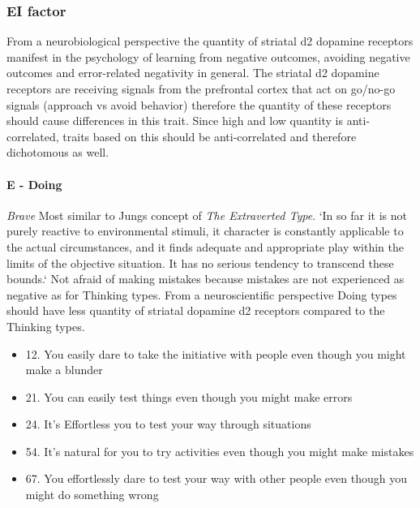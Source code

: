 \documentclass[11pt,a4paper]{article}
\begin{document}
\subsubsection{EI factor}
From a neurobiological perspective the quantity of striatal d2 dopamine receptors manifest in the psychology of learning from negative outcomes, avoiding negative outcomes and error-related negativity in general. The striatal d2 dopamine receptors are receiving signals from the prefrontal cortex that act on go/no-go signals (approach vs avoid behavior) therefore the quantity of these receptors should cause differences in this trait. Since high and low quantity is anti-correlated, traits based on this should be anti-correlated and therefore dichotomous as well.\cite{ie1,ie2,ie3,ie4,ie5,ie6,ie7}

\paragraph{E - Doing}
\emph{Brave}
Most similar to Jungs concept of \emph{The Extraverted Type}.
`In so far it is not purely reactive to environmental stimuli, it character is constantly applicable to the actual circumstances, and it finds adequate and appropriate play within the limits of the objective situation. It has no serious tendency to transcend these bounds.`\cite[p. 418]{jung1}
Not afraid of making mistakes because mistakes are not experienced as negative as for Thinking types.
From a neuroscientific perspective Doing types should have less quantity of striatal dopamine d2 receptors compared to the Thinking types.
\begin{itemize}
  \item 12. You easily dare to take the initiative with people even though you might make a blunder
  \item 21. You can easily test things even though you might make errors
  \item 24. It's Effortless you to test your way through situations
  \item 54. It's natural for you to try activities even though you might make mistakes
  \item 67. You effortlessly dare to test your way with other people even though you might do something wrong
\end{itemize}
\end{document}
